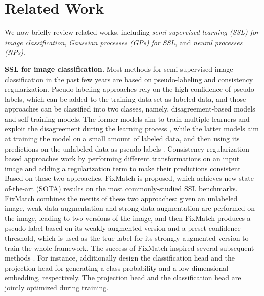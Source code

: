 \documentclass[nohyperref]{article}
\theoremstyle{plain}
\theoremstyle{definition}
\theoremstyle{remark}
\begin{document}
\section{Related Work}
\label{sec:related_work} 

We now briefly review related works, including {\it semi-super\-vised learning (SSL) for image classification}, {\it Gaussian processes (GPs) for SSL}, and {\it neural processes (NPs)}. 
 

{\bf SSL for image classification.} 
Most methods for semi-supervised image classification in the past few years are based on pseudo-labeling and consistency regularization. Pseudo-labeling approaches
rely on the high confidence of pseudo-labels, which can be added to the training data set as labeled data, and those approaches can be classified into two classes, namely, disagreement-based models and self-training models. The former models aim to train multiple learners and exploit the disagreement during the learning process \cite{qiao2018deep, dong2018tri}, while the latter models aim at training the model on a small amount of labeled data, and then using its predictions on the unlabeled data as pseudo-labels \cite{lee2013pseudo, zhai2019s4l, wang2020enaet, pham2021meta}. 
Consistency-regularization-based approaches work by performing different transformations on an input image and adding a regularization term to make their predictions consistent \cite{bachman2014learning, sajjadi2016regularization, laine2016temporal, berthelot2019mixmatch, xie2019unsupervised}. 
Based on these two approaches, FixMatch \cite{sohn2020fixmatch} is proposed, which achieves new state-of-the-art (SOTA) results on the most commonly-studied SSL benchmarks.
FixMatch \cite{sohn2020fixmatch} combines the merits of these two approaches: given an unlabeled image, weak data augmentation and strong data augmentation are performed on the image, leading to two versions of the image, and then FixMatch produces a pseudo-label based on its weakly-augmented version and a preset confidence threshold, which is used as the true label for its strongly augmented version to train the whole framework.  
The success of FixMatch inspired several subsequent methods \cite{li2021comatch, rizve2021defense, zhang2021flexmatch, nassar2021all, pham2021meta, hu2021simple}. For instance, \citet{li2021comatch} additionally design the classification head and the projection head for generating a class probability and a low-dimensional embedding, respectively. The projection head and the classification head are jointly optimized during training. 
\end{document}
